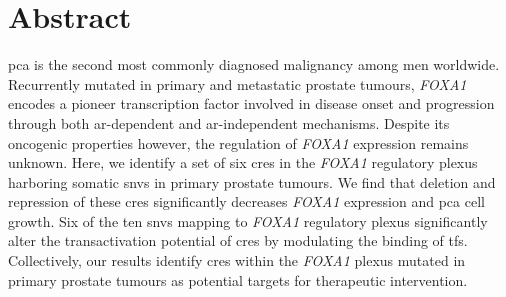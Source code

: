 \section{Abstract}

\Gls{pca} is the second most commonly diagnosed malignancy among men worldwide.
Recurrently mutated in primary and metastatic prostate tumours, \emph{FOXA1} encodes a pioneer transcription factor involved in disease onset and progression through both \gls{ar}-dependent and \gls{ar}-independent mechanisms.
Despite its oncogenic properties however, the regulation of \emph{FOXA1} expression remains unknown.
Here, we identify a set of six \glspl{cre} in the \emph{FOXA1} regulatory plexus harboring somatic \glspl{snv} in primary prostate tumours.
We find that deletion and repression of these \glspl{cre} significantly decreases \emph{FOXA1} expression and \gls{pca} cell growth.
Six of the ten \glspl{snv} mapping to \emph{FOXA1} regulatory plexus significantly alter the transactivation potential of \glspl{cre} by modulating the binding of \glspl{tf}.
Collectively, our results identify \glspl{cre} within the \emph{FOXA1} plexus mutated in primary prostate tumours as potential targets for therapeutic intervention.
